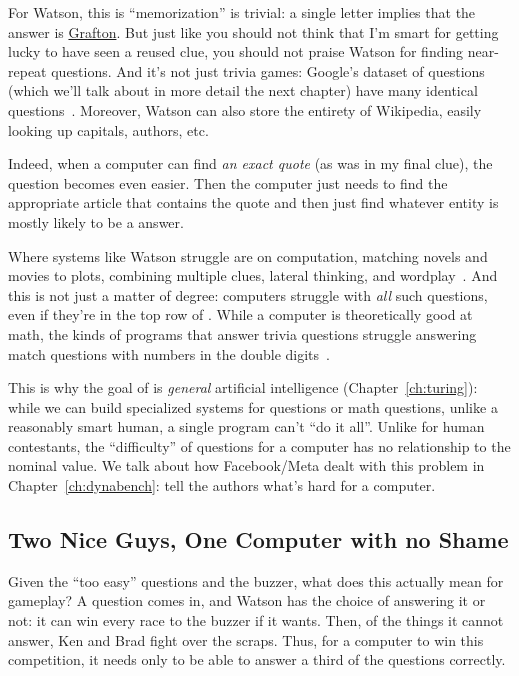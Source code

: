 For Watson, this is ``memorization'' is trivial: a single letter
implies that the answer is \underline{Grafton}.
%
But just like you should not think that I'm smart for getting lucky to
have seen a reused clue, you should not praise Watson for finding
near-repeat questions.
%
And it's not just trivia games: Google's dataset of questions (which
we'll talk about in more detail the next chapter) have
many identical questions~\citep{lewis-21}.
%
Moreover, Watson can also store the entirety of Wikipedia, easily
looking up capitals, authors, etc.

Indeed, when a computer can find \emph{an exact quote} (as was in my
final \jeopardy{} clue), the question becomes even easier.
%
Then the computer just needs to find the appropriate article that
contains the quote and then just find whatever entity is mostly likely
to be a \jeopardyp{} answer.

Where systems like Watson struggle are on computation, matching novels
and movies to plots, combining multiple clues, lateral thinking, and
wordplay~\citep{kaushik-18}.
%
And this is not just a matter of degree: computers struggle with \emph{all}
such questions, even if they're in the top row of \jeopardyp{}.
%
While a computer is theoretically good at math, the kinds of programs
that answer trivia questions struggle answering match questions with
numbers in the double digits~\citep{wallace-19:numbers}.

This is why the goal of  is \emph{general} artificial
intelligence (Chapter~\ref{ch:turing}): while we can build specialized
systems for \jeopardy{} questions or math questions, unlike a
reasonably smart human, a single program can't ``do it all''.
%
Unlike for human contestants, the ``difficulty'' of \jeopardy{}
questions for a computer has no relationship to the nominal value.
%
We talk about how Facebook/Meta dealt with this problem in
Chapter~\ref{ch:dynabench}: tell the authors what's hard for a computer.


\subsection{Two Nice Guys, One Computer with no Shame}

Given the ``too easy'' questions and the buzzer, what does this
actually mean for gameplay?
%
A question comes in, and Watson has the choice of answering it or not:
it can win every race to the buzzer if it wants.
%
Then, of the things it cannot answer, Ken and Brad fight over the
scraps.
%
Thus, for a computer to win this competition, it needs only to be able
to answer a third of the questions correctly.


